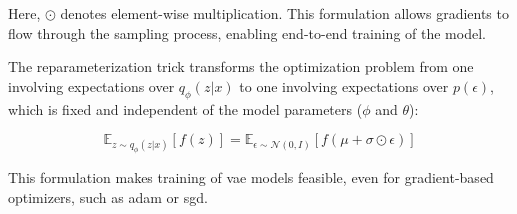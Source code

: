 Here, $\odot$ denotes element-wise multiplication. This formulation allows gradients to flow through the sampling process, enabling end-to-end training of the model.

The reparameterization trick transforms the optimization problem from one involving expectations over $q_\phi(z|x)$ to one involving expectations over $p(\epsilon)$, which is fixed and independent of the model parameters ($\phi$ and $\theta$):

\begin{equation}
    \mathbb{E}_{z \sim q_\phi(z|x)}[f(z)] = \mathbb{E}_{\epsilon \sim \mathcal{N}(0,I)}[f(\mu + \sigma \odot \epsilon)]
\end{equation}

This formulation makes training of \acrshort{vae} models feasible, even for gradient-based optimizers, such as \acrshort{adam} or \acrshort{sgd}.


